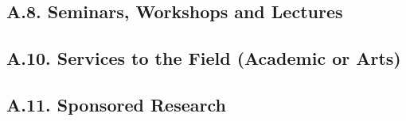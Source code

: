 \documentclass[10pt]{article}
\newcommand{\junk}[1]{}
\begin{document}
\junk{
\subsection*{A.7. Patents}



}

\subsection*{A.8. Seminars, Workshops and Lectures}




\junk{
\subsection*{A.9. Presentations Given at Conferences}



}

\subsection*{A.10. Services to the Field (Academic or Arts)}


\subsection*{A.11. Sponsored Research}

\end{document}
